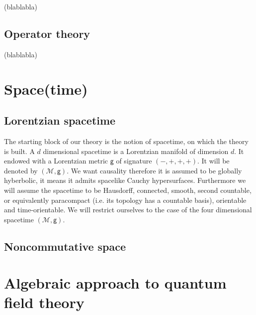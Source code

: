 \documentclass[11pt]{book}
\newcommand{\Mcal}{\mathcal{M}}
\newcommand{\gsf}{\mathsf{g}}
\begin{document}
(blablabla)

\chapter{Operator theory}

(blablabla)


\part{Space(time)}

\chapter{Lorentzian spacetime}

The starting block of our theory is the notion of spacetime, on which the theory is built. A $d$ dimensional spacetime is a Lorentzian manifold of dimension $d$. It endowed with a Lorentzian metric $\gsf$ of signature $(-,+,+,+)$. It will be denoted by $\left(\Mcal,\gsf\right)$. We want causality therefore it is assumed to be globally hyberbolic, it means it admits spacelike Cauchy hypersurfaces. Furthermore we will assume the spacetime to be Hausdorff, connected, smooth, second countable, or equivalently paracompact (i.e. its topology has a countable basis), orientable and time-orientable. We will restrict ourselves to the case of the four dimensional spacetime $\left(\Mcal,\gsf\right)$.\par%

\chapter{Noncommutative space}


\part{Algebraic approach to quantum field theory}
\end{document}
